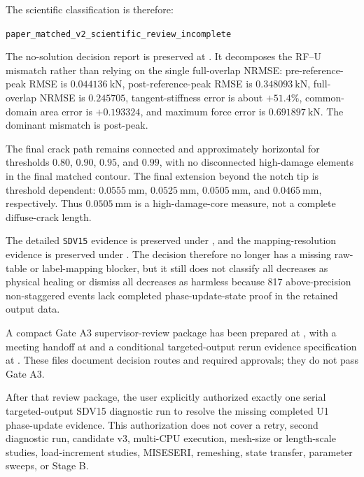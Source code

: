 \documentclass[11pt,a4paper]{article}
\begin{document}
The scientific classification is therefore:

\begin{center}
\texttt{paper\_matched\_v2\_scientific\_review\_incomplete}
\end{center}

The no-solution decision report is preserved at . It decomposes the RF--U mismatch rather than relying on the single full-overlap NRMSE: pre-reference-peak RMSE is \(0.044136\ \mathrm{kN}\), post-reference-peak RMSE is \(0.348093\ \mathrm{kN}\), full-overlap NRMSE is \(0.245705\), tangent-stiffness error is about \(+51.4\%\), common-domain area error is \(+0.193324\), and maximum force error is \(0.691897\ \mathrm{kN}\). The dominant mismatch is post-peak.

The final crack path remains connected and approximately horizontal for thresholds \(0.80\), \(0.90\), \(0.95\), and \(0.99\), with no disconnected high-damage elements in the final matched contour. The final extension beyond the notch tip is threshold dependent: \(0.0555\ \mathrm{mm}\), \(0.0525\ \mathrm{mm}\), \(0.0505\ \mathrm{mm}\), and \(0.0465\ \mathrm{mm}\), respectively. Thus \(0.0505\ \mathrm{mm}\) is a high-damage-core measure, not a complete diffuse-crack length.

The detailed \texttt{SDV15} evidence is preserved under , and the mapping-resolution evidence is preserved under . The decision therefore no longer has a missing raw-table or label-mapping blocker, but it still does not classify all decreases as physical healing or dismiss all decreases as harmless because 817 above-precision non-staggered events lack completed phase-update-state proof in the retained output data.

A compact Gate A3 supervisor-review package has been prepared at , with a meeting handoff at  and a conditional targeted-output rerun evidence specification at . These files document decision routes and required approvals; they do not pass Gate A3.

After that review package, the user explicitly authorized exactly one serial targeted-output SDV15 diagnostic run to resolve the missing completed U1 phase-update evidence. This authorization does not cover a retry, second diagnostic run, candidate v3, multi-CPU execution, mesh-size or length-scale studies, load-increment studies, MISESERI, remeshing, state transfer, parameter sweeps, or Stage B.
\end{document}
